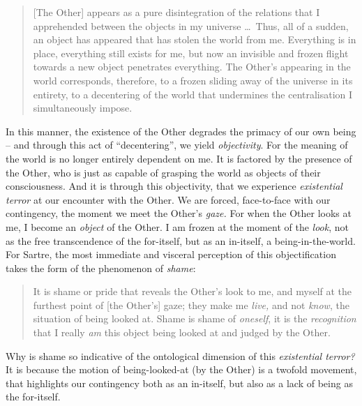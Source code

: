 \blockcquote[350 -- 351]{Sartre}{[The Other] appears as a pure disintegration of the relations that I apprehended between the objects in my universe \ldots\ Thus, all of a sudden, an object has appeared that has stolen the world from me. Everything is in place, everything still exists for me, but now an invisible and frozen flight towards a new object penetrates everything. The Other's appearing in the world corresponds, therefore, to a frozen sliding away of the universe in its entirety, to a decentering of the world that undermines the centralisation I simultaneously impose.}

\noindent
In this manner, the existence of the Other degrades the primacy of our own being -- and through this act of \enquote{decentering}, we yield \emph{objectivity}. For the meaning of the world is no longer entirely dependent on me. It is factored by the presence of the Other, who is just as capable of grasping the world as objects of their consciousness. And it is through this objectivity, that we experience \emph{existential terror} at our encounter with the Other. We are forced, face-to-face with our contingency, the moment we meet the Other's \emph{gaze.} For when the Other looks at me, I become an \emph{object} of the Other. I am frozen at the moment of the \emph{look}, not as the free transcendence of the for-itself, but as an in-itself, a being-in-the-world. For Sartre, the most immediate and visceral perception of this objectification takes the form of the phenomenon of \emph{shame}:

\blockcquote[357 -- 358]{Sartre}{It is shame or pride that reveals the Other's look to me, and myself at the furthest point of [the Other's] gaze; they make me \emph{live,} and not \emph{know}, the situation of being looked at. Shame is shame of \emph{oneself}, it is the \emph{recognition} that I really \emph{am} this object being looked at and judged by the Other.}

\noindent
Why is shame so indicative of the ontological dimension of this \emph{existential terror?} It is because the motion of being-looked-at (by the Other) is a twofold movement, that highlights our contingency both as an in-itself, but also as a lack of being as the for-itself.

